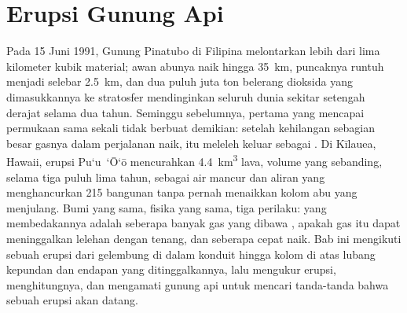 \chapter{Erupsi Gunung Api}\label{ch:b2:eruptive-styles}

Pada 15 Juni 1991, Gunung Pinatubo di Filipina melontarkan lebih dari lima
kilometer kubik material; awan abunya naik hingga
\qty{35}{km}, puncaknya runtuh menjadi  selebar \qty{2.5}{km}, dan
dua puluh juta ton belerang dioksida yang dimasukkannya ke stratosfer mendinginkan
seluruh dunia sekitar setengah derajat selama dua tahun. Seminggu sebelumnya,  pertama
yang mencapai permukaan sama sekali tidak berbuat demikian: setelah kehilangan sebagian besar
gasnya dalam perjalanan naik,  itu meleleh keluar sebagai . Di Kīlauea, Hawaii,
erupsi Pu`u~`\=O`\=o mencurahkan \qty{4.4}{km^3} lava, volume yang sebanding,
selama tiga puluh lima tahun, sebagai air mancur dan aliran yang menghancurkan 215 bangunan
tanpa pernah menaikkan kolom abu yang menjulang. Bumi yang sama, fisika yang sama, tiga perilaku: yang
membedakannya adalah seberapa banyak gas yang dibawa , apakah gas itu dapat meninggalkan
lelehan dengan tenang, dan seberapa cepat  naik. Bab ini mengikuti sebuah erupsi
dari gelembung di dalam konduit hingga kolom di atas lubang kepundan dan endapan yang
ditinggalkannya, lalu mengukur erupsi, menghitungnya, dan mengamati gunung api untuk mencari
tanda-tanda bahwa sebuah erupsi akan datang.

